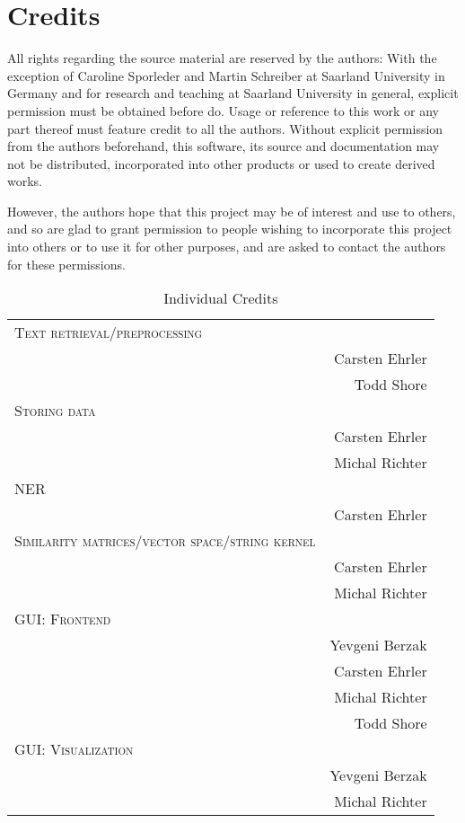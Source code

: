 \section{Credits}
All rights regarding the source material are reserved by the authors: With the exception of Caroline Sporleder and Martin Schreiber at Saarland University in Germany and for research and teaching at Saarland University in general, explicit permission must be obtained before do. Usage or reference to this work or any part thereof must feature credit to all the authors. Without explicit permission from the authors beforehand, this software, its source and documentation may not be distributed, incorporated into other products or used to create derived works.

However, the authors hope that this project may be of interest and use to others, and so are glad to grant permission to people wishing to incorporate this project into others or to use it for other purposes, and are asked to contact the authors for these permissions.

\begin{table}[h]
\centering
\caption{Individual Credits}
\begin{tabular}{l r}
\toprule
  	\textsc{Text retrieval/preprocessing} &  \\
  		& Carsten Ehrler \\
 		& Todd Shore \\
  	\textsc{Storing data} & \\
  		& Carsten Ehrler \\ 
  		& Michal Richter \\
	\textsc{NER} & \\
		& Carsten Ehrler \\
	\textsc{Similarity matrices/vector space/string kernel} & \\
		& Carsten Ehrler \\
		& Michal Richter \\
	\textsc{GUI: Frontend} & \\
		& Yevgeni Berzak \\
  		& Carsten Ehrler \\
		& Michal Richter \\
		& Todd Shore \\
	\textsc{GUI: Visualization} & \\
		& Yevgeni Berzak \\
		& Michal Richter \\
  \bottomrule
\end{tabular}
\end{table}
